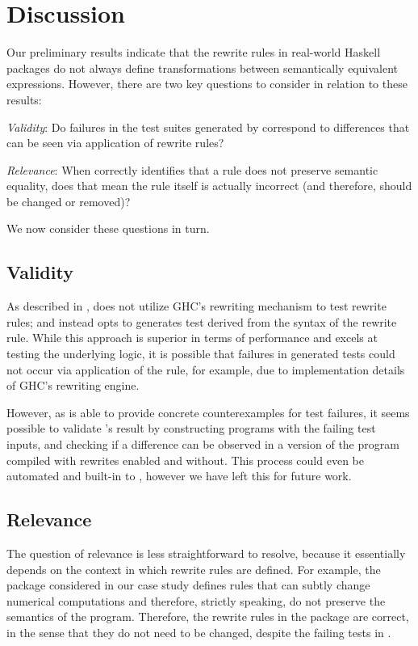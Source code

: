 \section{Discussion}\label{sec:discussion}

Our preliminary results indicate that the rewrite rules in real-world Haskell
packages do not always define transformations between semantically equivalent
expressions. However, there are two key questions to consider in relation to these
results:
\smallskip

\textit{Validity}: Do failures in the test suites generated by \Rulecheck
correspond to differences that can be seen via application of rewrite rules?
\smallskip

\textit{Relevance}: When \Rulecheck correctly identifies that a rule does not
preserve semantic equality, does that mean the rule itself is actually incorrect
(and therefore, should be changed or removed)?
\smallskip

We now consider these questions in turn.

\subsection{Validity}

As described in , \Rulecheck does not utilize GHC's
rewriting mechanism to test rewrite rules; and instead opts to generates test
derived from the syntax of the rewrite rule. While this approach is superior in
terms of performance and excels at testing the underlying logic, it is possible
that failures in \Rulecheck generated tests could not occur via application of
the rule, for example, due to implementation details of GHC's rewriting engine.

However, as \Rulecheck is able to provide concrete counterexamples for test
failures, it seems possible to validate \Rulecheck's result by constructing
programs with the failing test inputs, and checking if a difference can be
observed in a version of the program compiled with rewrites enabled and without.
This process could even be automated and built-in to \Rulecheck, however we have
left this for future work.

\subsection{Relevance}

The question of relevance is less straightforward to resolve, because it
essentially depends on the context in which rewrite rules are defined. For
example, the \fastmath package considered in our case study defines rules that
can subtly change numerical computations and therefore, strictly speaking, do
not preserve the semantics of the program. Therefore, the rewrite rules in the
package are correct, in the sense that they do not need to be changed, despite
the failing tests in \Rulecheck.

